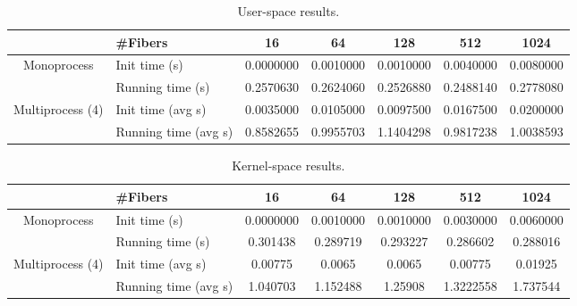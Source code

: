 \documentclass[11pt]{article}
\begin{document}
\begin{center}
\begin{table}[H]
\begin{tabular}{|c|l|c|c|c|c|c|}
\hline
\multicolumn{1}{|l|}{}            & \multicolumn{1}{l|}{\#Fibers} & 16        & 64        & 128       & 512       & 1024      \\ \hline
\multirow{2}{*}{Monoprocess}      & Init time (s)                 & 0.0000000 & 0.0010000 & 0.0010000 & 0.0040000 & 0.0080000 \\ \cline{2-7} 
                                  & Running time (s)              & 0.2570630 & 0.2624060 & 0.2526880 & 0.2488140 & 0.2778080 \\ \hline
\multirow{2}{*}{Multiprocess (4)} & Init time (avg s)             & 0.0035000 & 0.0105000 & 0.0097500 & 0.0167500 & 0.0200000 \\ \cline{2-7} 
                                  & Running time (avg s)          & 0.8582655 & 0.9955703 & 1.1404298 & 0.9817238 & 1.0038593 \\ \hline
\end{tabular}
\caption{User-space results.}
\label{tablet1}
\end{table}
\end{center}

\begin{center}
\begin{table}[H]
\begin{tabular}{|c|l|c|c|c|c|c|}
\hline
\multicolumn{1}{|l|}{}            & \multicolumn{1}{l|}{\#Fibers} & 16       & 64       & 128      & 512       & 1024     \\ \hline
\multirow{2}{*}{Monoprocess}      & Init time (s)                 & 0.0000000        & 0.0010000    & 0.0010000    & 0.0030000     & 0.0060000    \\ \cline{2-7} 
                                  & Running time (s)              & 0.301438 & 0.289719 & 0.293227 & 0.286602  & 0.288016 \\ \hline
\multirow{2}{*}{Multiprocess (4)} & Init time (avg s)             & 0.00775  & 0.0065   & 0.0065   & 0.00775   & 0.01925  \\ \cline{2-7} 
                                  & Running time (avg s)          & 1.040703 & 1.152488 & 1.25908  & 1.3222558 & 1.737544 \\ \hline
\end{tabular}
\caption{Kernel-space results.}
\label{table:t2}
\end{table}
\end{center}
\end{document}
